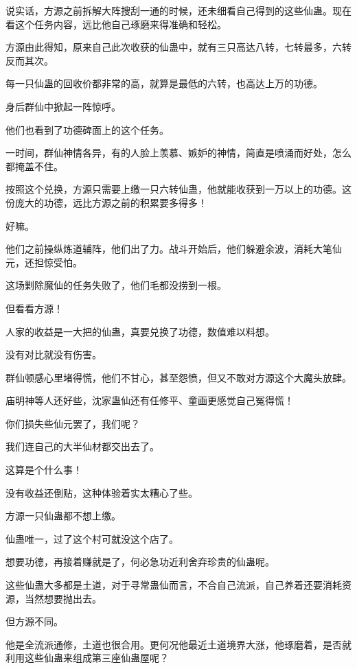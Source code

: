 \begin{this_body}
说实话，方源之前拆解大阵搜刮一通的时候，还未细看自己得到的这些仙蛊。现在看这个任务内容，远比他自己琢磨来得准确和轻松。

方源由此得知，原来自己此次收获的仙蛊中，就有三只高达八转，七转最多，六转反而其次。

每一只仙蛊的回收价都非常的高，就算是最低的六转，也高达上万的功德。

身后群仙中掀起一阵惊呼。

他们也看到了功德碑面上的这个任务。

一时间，群仙神情各异，有的人脸上羡慕、嫉妒的神情，简直是喷涌而好处，怎么都掩盖不住。

按照这个兑换，方源只需要上缴一只六转仙蛊，他就能收获到一万以上的功德。这份庞大的功德，远比方源之前的积累要多得多！

好嘛。

他们之前操纵炼道辅阵，他们出了力。战斗开始后，他们躲避余波，消耗大笔仙元，还担惊受怕。

这场剿除魔仙的任务失败了，他们毛都没捞到一根。

但看看方源！

人家的收益是一大把的仙蛊，真要兑换了功德，数值难以料想。

没有对比就没有伤害。

群仙顿感心里堵得慌，他们不甘心，甚至怨愤，但又不敢对方源这个大魔头放肆。

庙明神等人还好些，沈家蛊仙还有任修平、童画更感觉自己冤得慌！

你们损失些仙元罢了，我们呢？

我们连自己的大半仙材都交出去了。

这算是个什么事！

没有收益还倒贴，这种体验着实太糟心了些。

方源一只仙蛊都不想上缴。

仙蛊唯一，过了这个村可就没这个店了。

想要功德，再接着赚就是了，何必急功近利舍弃珍贵的仙蛊呢。

这些仙蛊大多都是土道，对于寻常蛊仙而言，不合自己流派，自己养着还要消耗资源，当然想要抛出去。

但方源不同。

他是全流派通修，土道也很合用。更何况他最近土道境界大涨，他琢磨着，是否就利用这些仙蛊来组成第三座仙蛊屋呢？

\end{this_body}

